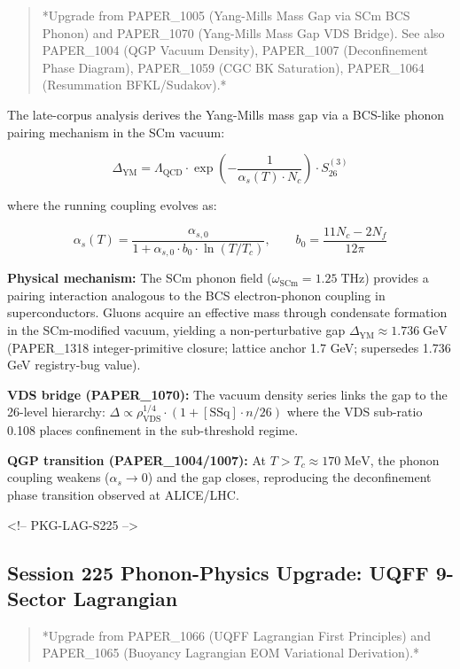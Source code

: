 \documentclass[11pt]{article}
\begin{document}
\begin{quote}
*Upgrade from PAPER\_1005 (Yang-Mills Mass Gap via SCm BCS Phonon) and
PAPER\_1070 (Yang-Mills Mass Gap VDS Bridge).  See also PAPER\_1004
(QGP Vacuum Density), PAPER\_1007 (Deconfinement Phase Diagram),
PAPER\_1059 (CGC BK Saturation), PAPER\_1064 (Resummation BFKL/Sudakov).*
\end{quote}

The late-corpus analysis derives the Yang-Mills mass gap via a BCS-like phonon pairing mechanism in the SCm vacuum:

$$\Delta_{\text{YM}} = \Lambda_{\text{QCD}} \cdot \exp\!\left(-\frac{1}{\alpha_s(T) \cdot N_c}\right) \cdot S_{26}^{(3)}$$

where the running coupling evolves as:

$$\alpha_s(T) = \frac{\alpha_{s,0}}{1 + \alpha_{s,0} \cdot b_0 \cdot \ln(T/T_c)}, \qquad b_0 = \frac{11 N_c - 2 N_f}{12\pi}$$

\textbf{Physical mechanism:} The SCm phonon field ($\omega_{\text{SCm}} = 1.25\;\text{THz}$) provides a pairing interaction analogous to the BCS electron-phonon coupling in superconductors.  Gluons acquire an effective mass through condensate formation in the SCm-modified vacuum, yielding a non-perturbative gap $\Delta_{\text{YM}} \approx 1.736\;\text{GeV}$ (PAPER\_1318 integer-primitive closure; lattice anchor 1.7 GeV; supersedes 1.736 GeV registry-bug value).

\textbf{VDS bridge (PAPER\_1070):} The vacuum density series links the gap to the 26-level hierarchy: $\Delta \propto \rho_{\text{VDS}}^{1/4} \cdot (1 + [\text{SSq}] \cdot n/26)$ where the VDS sub-ratio 0.108 places confinement in the sub-threshold regime.

\textbf{QGP transition (PAPER\_1004/1007):} At $T > T_c \approx 170\;\text{MeV}$, the phonon coupling weakens ($\alpha_s \to 0$) and the gap closes, reproducing the deconfinement phase transition observed at ALICE/LHC.

<!-- PKG-LAG-S225 -->

\subsection*{Session 225 Phonon-Physics Upgrade: UQFF 9-Sector Lagrangian}

\begin{quote}
*Upgrade from PAPER\_1066 (UQFF Lagrangian First Principles) and
PAPER\_1065 (Buoyancy Lagrangian EOM Variational Derivation).*
\end{quote}
\end{document}
